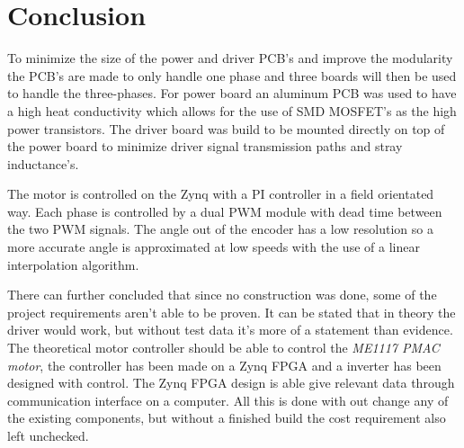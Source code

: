 \section{Conclusion}
\label{sec:conclusion}


To minimize the size of the power and driver PCB's and improve the modularity the PCB's are made to only handle one phase and three boards will then be used to handle the three-phases.
For power board an aluminum PCB was used to have a high heat conductivity which allows for the use of SMD MOSFET's as the high power transistors. The driver board was build to be mounted directly on top of the power board to minimize driver signal transmission paths and stray inductance's.

The motor is controlled on the Zynq with a PI controller in a field orientated way. Each phase is controlled by a dual PWM module with dead time between the two PWM signals.
The angle out of the encoder has a low resolution so a more accurate angle is approximated at low speeds with the use of a linear interpolation algorithm. 

There can further concluded that since no construction was done, some of the project requirements aren't able to be proven. It can be stated that in theory the driver would work, but without test data it's more of a statement than evidence. The theoretical motor controller should be able to control the \textit{ME1117 PMAC motor}, the controller has been made on a Zynq FPGA and a inverter has been designed with control. The Zynq FPGA design is able give relevant data through communication interface on a computer. All this is done with out change any of the existing components, but without a finished build the cost requirement also left unchecked.